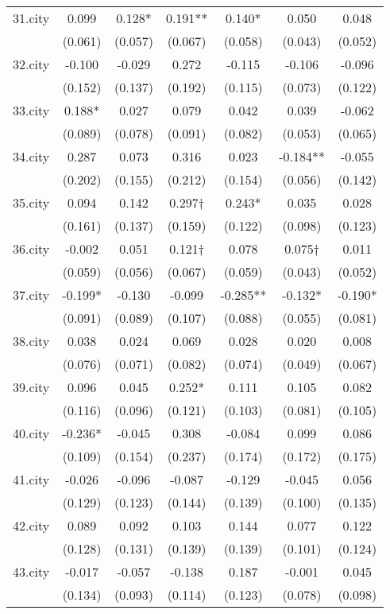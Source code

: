 \documentclass[]{article}
\begin{document}
\begin{tabular}{lcccccc}
31.city & 0.099 & 0.128* & 0.191** & 0.140* & 0.050 & 0.048 \\
 & (0.061) & (0.057) & (0.067) & (0.058) & (0.043) & (0.052) \\
32.city & -0.100 & -0.029 & 0.272 & -0.115 & -0.106 & -0.096 \\
 & (0.152) & (0.137) & (0.192) & (0.115) & (0.073) & (0.122) \\
33.city & 0.188* & 0.027 & 0.079 & 0.042 & 0.039 & -0.062 \\
 & (0.089) & (0.078) & (0.091) & (0.082) & (0.053) & (0.065) \\
34.city & 0.287 & 0.073 & 0.316 & 0.023 & -0.184** & -0.055 \\
 & (0.202) & (0.155) & (0.212) & (0.154) & (0.056) & (0.142) \\
35.city & 0.094 & 0.142 & 0.297† & 0.243* & 0.035 & 0.028 \\
 & (0.161) & (0.137) & (0.159) & (0.122) & (0.098) & (0.123) \\
36.city & -0.002 & 0.051 & 0.121† & 0.078 & 0.075† & 0.011 \\
 & (0.059) & (0.056) & (0.067) & (0.059) & (0.043) & (0.052) \\
37.city & -0.199* & -0.130 & -0.099 & -0.285** & -0.132* & -0.190* \\
 & (0.091) & (0.089) & (0.107) & (0.088) & (0.055) & (0.081) \\
38.city & 0.038 & 0.024 & 0.069 & 0.028 & 0.020 & 0.008 \\
 & (0.076) & (0.071) & (0.082) & (0.074) & (0.049) & (0.067) \\
39.city & 0.096 & 0.045 & 0.252* & 0.111 & 0.105 & 0.082 \\
 & (0.116) & (0.096) & (0.121) & (0.103) & (0.081) & (0.105) \\
40.city & -0.236* & -0.045 & 0.308 & -0.084 & 0.099 & 0.086 \\
 & (0.109) & (0.154) & (0.237) & (0.174) & (0.172) & (0.175) \\
41.city & -0.026 & -0.096 & -0.087 & -0.129 & -0.045 & 0.056 \\
 & (0.129) & (0.123) & (0.144) & (0.139) & (0.100) & (0.135) \\
42.city & 0.089 & 0.092 & 0.103 & 0.144 & 0.077 & 0.122 \\
 & (0.128) & (0.131) & (0.139) & (0.139) & (0.101) & (0.124) \\
43.city & -0.017 & -0.057 & -0.138 & 0.187 & -0.001 & 0.045 \\
 & (0.134) & (0.093) & (0.114) & (0.123) & (0.078) & (0.098) \\

\end{tabular}
\end{document}
